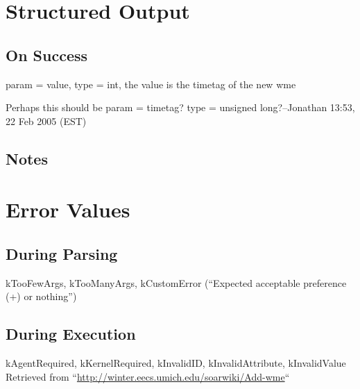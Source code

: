 \documentclass[10pt]{article}
\begin{document}
\section*{ Structured Output }
\subsection*{ On Success }


 param = value, type = int, the value is the timetag of the new wme 


 Perhaps this should be param = timetag? type = unsigned long?--Jonathan 13:53, 22 Feb 2005 (EST) 
\subsection*{ Notes }
\section*{ Error Values }
\subsection*{ During Parsing }


 kTooFewArgs, kTooManyArgs, kCustomError (``Expected acceptable preference (+) or nothing'') 
\subsection*{ During Execution }


 kAgentRequired, kKernelRequired, kInvalidID, kInvalidAttribute, kInvalidValue Retrieved from ``\url{http://winter.eecs.umich.edu/soarwiki/Add-wme}``
\end{document}
